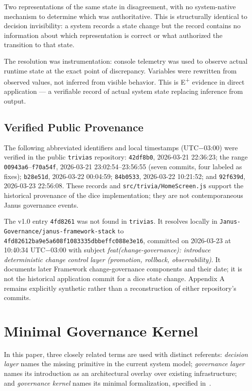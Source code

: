 \documentclass[conference]{IEEEtran}
\begin{document}
Two representations of the same state in disagreement, with no system-native mechanism to determine which was authoritative. This is structurally identical to decision invisibility: a system records a state change but the record contains no information about which representation is correct or what authorized the transition to that state.

The resolution was instrumentation: console telemetry was used to observe actual runtime state at the exact point of discrepancy. Variables were rewritten from observed values, not inferred from visible behavior. This is E\textsuperscript{+} evidence in direct application --- a verifiable record of actual system state replacing inference from output.

\subsection{Verified Public Provenance}

The following abbreviated identifiers and local timestamps (UTC$-$03:00) were
verified in the public \texttt{trivias} repository: \texttt{42df8b0}, 2026-03-21
22:36:23; the range \texttt{00943a6}--\texttt{f70a54f}, 2026-03-21
23:02:54--23:56:55 (seven commits, four labeled as fixes); \texttt{b28e51d},
2026-03-22 00:04:59; \texttt{84b0533}, 2026-03-22 10:21:52; and
\texttt{92f639d}, 2026-03-23 22:56:08. These records and
\texttt{src/trivia/HomeScreen.js} support the historical provenance of the dice
implementation; they are not contemporaneous Janus governance events.

The v1.0 entry \texttt{4fd8261} was not found in \texttt{trivias}. It resolves
locally in \texttt{Janus-Governance/janus-framework-stack} to
\texttt{4fd82612ba9e5a608f1083335dbbeffc088e3e16}, committed on 2026-03-23 at
10:40:34 UTC$-$03:00 with subject \emph{feat(change-governance): introduce
deterministic change control layer (promotion, rollback, observability)}. It
documents later Framework change-governance components and their date; it is not
the historical application commit for a dice state change. Appendix A remains
explicitly synthetic rather than a reconstruction of either repository's
commits.

\section{Minimal Governance Kernel}

In this paper, three closely related terms are used with distinct referents: \emph{decision layer} names the missing primitive in the current system model; \emph{governance layer} names its introduction as an architectural overlay over existing infrastructure; and \emph{governance kernel} names its minimal formalization, specified in~\cite{sanchez_core,sanchez_framework}.
\end{document}
